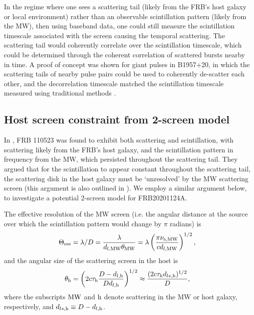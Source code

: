 \documentclass[fleqn,usenatbib]{mnras}
\newcommand{\frb}{FRB20201124A}
\begin{document}
In the regime where one sees a scattering tail (likely from the FRB's host galaxy or local environment) rather than an observable scintillation pattern (likely from the MW), then using baseband data, one could still measure the scintillation timescale associated with the screen causing the temporal scattering.  The scattering tail would coherently correlate over the scintillation timescale, which could be determined through the coherent correlation of scattered bursts nearby in time.
A proof of concept was shown for giant pulses in B1957+20, in which the scattering tails of nearby pulse pairs could be used to coherently de-scatter each other, and the decorrelation timescale matched the scintillation timescale measured using traditional methods \citep{main+17}.

\subsection{Host screen constraint from 2-screen model}

 In \citet{masui+15}, FRB 110523 was found to exhibit both scattering and scintillation, with scattering likely from the FRB's host galaxy, and the scintillation pattern in frequency from the MW, which persisted throughout the scattering tail.  They argued that for the scintillation to appear constant throughout the scattering tail, the scattering disk in the host galaxy must be `unresolved' by the MW scattering screen (this argument is also outlined in \citealt{cordes+19}).  We employ a similar argument below, to investigate a potential 2-screen model for \frb{}.

The effective resolution of the MW screen (i.e. the angular distance at the source over which the scintillation pattern would change by $\pi$ radians) is
\begin{equation}
\Theta_\mathrm{res} = \lambda/D = \frac{\lambda}{d_{l,\rm MW} \theta_{\rm MW}} = \lambda \left(\frac{\pi \nu_{\rm s, MW}}{c d_{l,\rm MW}} \right)^{1/2},
\end{equation}
and the angular size of the scattering screen in the host is 
\begin{equation}
\theta_{\rm h} = \left(2 c \tau_{\rm h} \frac{D-d_{l,\rm h}}{D d_{l,\rm h}}  \right)^{1/2} \approx \frac{(2c\tau_{\rm h} d_{ls, \rm h})^{1/2}}{D},
\end{equation}
where the subscripts $\rm MW$ and $\rm h$ denote scattering in the MW or host galaxy, respectively, and $d_{ls, \rm h} \equiv D-d_{l,\rm h}$.
\end{document}
